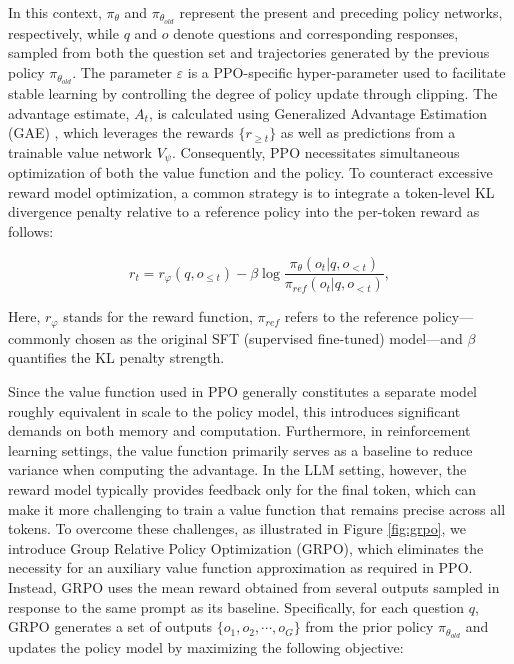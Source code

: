 \begin{itemize}[topsep=0pt]
In this context, $\pi_{\theta}$ and $\pi_{\theta_{old}}$ represent the present and preceding policy networks, respectively, while $q$ and $o$ denote questions and corresponding responses, sampled from both the question set and trajectories generated by the previous policy $\pi_{\theta_{old}}$. The parameter $\varepsilon$ is a PPO-specific hyper-parameter used to facilitate stable learning by controlling the degree of policy update through clipping. The advantage estimate, $A_t$, is calculated using Generalized Advantage Estimation (GAE) \citep{gae}, which leverages the rewards $\{r_{\ge t}\}$ as well as predictions from a trainable value network $V_{\psi}$. Consequently, PPO necessitates simultaneous optimization of both the value function and the policy. To counteract excessive reward model optimization, a common strategy is to integrate a token-level KL divergence penalty relative to a reference policy into the per-token reward \citep{ouyang2022training} as follows:

\begin{equation}
    r_{t} = r_\varphi(q, o_{\le t}) - \beta \log\frac{\pi_{\theta}(o_{t}|q, o_{<t})}{\pi_{ref}(o_{t}|q, o_{<t})},
\label{eq:PPO-reward}
\end{equation}

Here, $r_\varphi$ stands for the reward function, $\pi_{ref}$ refers to the reference policy—commonly chosen as the original SFT (supervised fine-tuned) model—and $\beta$ quantifies the KL penalty strength.

Since the value function used in PPO generally constitutes a separate model roughly equivalent in scale to the policy model, this introduces significant demands on both memory and computation. Furthermore, in reinforcement learning settings, the value function primarily serves as a baseline to reduce variance when computing the advantage. In the LLM setting, however, the reward model typically provides feedback only for the final token, which can make it more challenging to train a value function that remains precise across all tokens. To overcome these challenges, as illustrated in Figure \ref{fig:grpo}, we introduce Group Relative Policy Optimization (GRPO), which eliminates the necessity for an auxiliary value function approximation as required in PPO. Instead, GRPO uses the mean reward obtained from several outputs sampled in response to the same prompt as its baseline. Specifically, for each question $q$, GRPO generates a set of outputs $\{o_1, o_2, \cdots, o_G\}$ from the prior policy $\pi_{\theta_{old}}$ and updates the policy model by maximizing the following objective:


\end{itemize}
